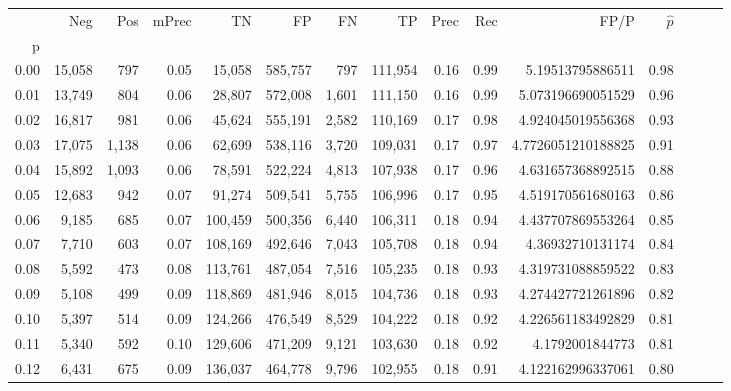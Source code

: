 \begin{tabular}{rrrrrrrrrrrrrrr}
\toprule
{} &     Neg &    Pos & mPrec &       TN &       FP &       FN &       TP &  Prec &   Rec &                  FP/P & $\hat{p}$ \\
p    &         &        &       &          &          &          &          &       &       &                       &           \\
\midrule
0.00 &  15,058 &    797 &  0.05 &   15,058 &  585,757 &      797 &  111,954 &  0.16 &  0.99 &      5.19513795886511 &      0.98 \\
0.01 &  13,749 &    804 &  0.06 &   28,807 &  572,008 &    1,601 &  111,150 &  0.16 &  0.99 &     5.073196690051529 &      0.96 \\
0.02 &  16,817 &    981 &  0.06 &   45,624 &  555,191 &    2,582 &  110,169 &  0.17 &  0.98 &     4.924045019556368 &      0.93 \\
0.03 &  17,075 &  1,138 &  0.06 &   62,699 &  538,116 &    3,720 &  109,031 &  0.17 &  0.97 &    4.7726051210188825 &      0.91 \\
0.04 &  15,892 &  1,093 &  0.06 &   78,591 &  522,224 &    4,813 &  107,938 &  0.17 &  0.96 &     4.631657368892515 &      0.88 \\
0.05 &  12,683 &    942 &  0.07 &   91,274 &  509,541 &    5,755 &  106,996 &  0.17 &  0.95 &     4.519170561680163 &      0.86 \\
0.06 &   9,185 &    685 &  0.07 &  100,459 &  500,356 &    6,440 &  106,311 &  0.18 &  0.94 &     4.437707869553264 &      0.85 \\
0.07 &   7,710 &    603 &  0.07 &  108,169 &  492,646 &    7,043 &  105,708 &  0.18 &  0.94 &      4.36932710131174 &      0.84 \\
0.08 &   5,592 &    473 &  0.08 &  113,761 &  487,054 &    7,516 &  105,235 &  0.18 &  0.93 &     4.319731088859522 &      0.83 \\
0.09 &   5,108 &    499 &  0.09 &  118,869 &  481,946 &    8,015 &  104,736 &  0.18 &  0.93 &     4.274427721261896 &      0.82 \\
0.10 &   5,397 &    514 &  0.09 &  124,266 &  476,549 &    8,529 &  104,222 &  0.18 &  0.92 &     4.226561183492829 &      0.81 \\
0.11 &   5,340 &    592 &  0.10 &  129,606 &  471,209 &    9,121 &  103,630 &  0.18 &  0.92 &       4.1792001844773 &      0.81 \\
0.12 &   6,431 &    675 &  0.09 &  136,037 &  464,778 &    9,796 &  102,955 &  0.18 &  0.91 &     4.122162996337061 &      0.80 \\

\end{tabular}
